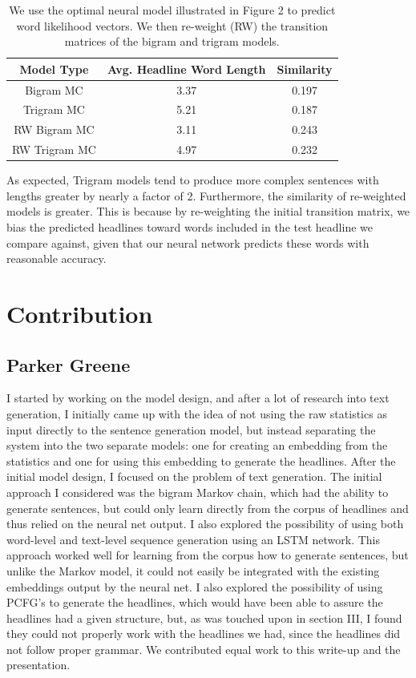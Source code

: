 \documentclass[12pt, journal]{IEEEtran}
\begin{document}
\begin{table}[!t]
\renewcommand{\arraystretch}{1.3}
\caption{We use the optimal neural model illustrated in Figure 2 to predict word likelihood vectors. We then re-weight (RW) the transition matrices of the bigram and trigram models.}
\label{table_example}
\centering
\begin{tabular}{|c||c||c|}
\hline
Model Type & Avg. Headline Word Length & Similarity \\
\hline
Bigram MC & 3.37 & 0.197\\
Trigram MC & 5.21 & 0.187\\
RW Bigram MC & 3.11 & 0.243\\
RW Trigram MC & 4.97 &  0.232\\

\hline
\end{tabular}
\end{table}

As expected, Trigram models tend to produce more complex sentences with lengths greater by nearly a factor of 2. Furthermore, the similarity of re-weighted models is greater. This is because by re-weighting the initial transition matrix, we bias the predicted headlines toward words included in the test headline we compare against, given that our neural network predicts these words with reasonable accuracy.

\section{Contribution}

\subsection{Parker Greene}

I started by working on the model design, and after a lot of research into text generation, I initially came up with the idea of not using the raw statistics as input directly to the sentence generation model, but instead separating the system into the two separate models: one for creating an embedding from the statistics and one for using this embedding to generate the headlines. After the initial model design, I focused on the problem of text generation. The initial approach I considered was the bigram Markov chain, which had the ability to generate sentences, but could only learn directly from the corpus of headlines and thus relied on the neural net output. I also explored the possibility of using both word-level and text-level sequence generation using an LSTM network. This approach worked well for learning from the corpus how to generate sentences, but unlike the Markov model, it could not easily be integrated with the existing embeddings output by the neural net. I also explored the possibility of using PCFG's to generate the headlines, which would have been able to assure the headlines had a given structure, but, as was touched upon in section III, I found they could not properly work with the headlines we had, since the headlines did not follow proper grammar. We contributed equal work to this write-up and the presentation.
\end{document}
